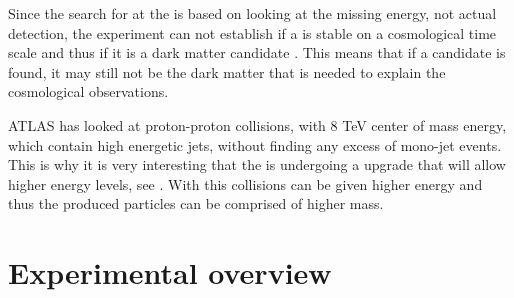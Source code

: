 Since the search for \abbrWIMPS at the \abbrLHC is based on looking at the missing energy, not actual detection, the experiment can not establish if a \abbrWIMP is stable on a cosmological time scale and thus if it is a dark matter candidate \citep{CERN-PH-EP-2012-210}. This means that if a candidate is found, it may still not be the dark matter that is needed to explain the cosmological observations.

ATLAS has looked at proton-proton collisions, with 8 TeV center of mass energy, which contain high energetic jets, without finding any excess of mono-jet events. This is why it is very interesting that the \abbrLHC is undergoing a upgrade that will allow higher energy levels, see . With this collisions can be given higher energy and thus the produced particles can be comprised of higher mass. 
\newpage
\section{Experimental overview}\label{sec:experiment}
